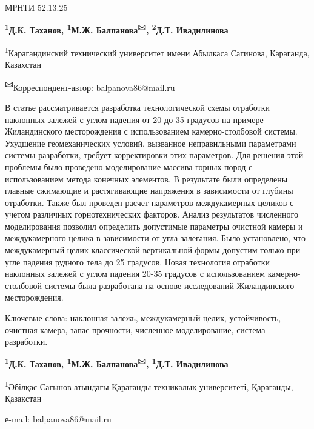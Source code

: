 \newpage
МРНТИ 52.13.25


\begin{center}
{\bfseries \textsuperscript{1}Д.К. Таханов, \textsuperscript{1}М.Ж.
Балпанова\textsuperscript{🖂}, \textsuperscript{2}Д.Т. Ивадилинова}

\textsuperscript{1}Карагандинский технический университет имени Абылкаса
Сагинова, Караганда, Казахстан

{\bfseries \textsuperscript{🖂}}Корреспондент-автор: balpanova86@mail.ru
\end{center}

В статье рассматривается разработка технологической схемы отработки
наклонных залежей с углом падения от 20 до 35 градусов на примере
Жиландинского месторождения с использованием камерно-столбовой системы.
Ухудшение геомеханических условий, вызванное неправильными параметрами
системы разработки, требует корректировки этих параметров. Для решения
этой проблемы было проведено моделирование массива горных пород с
использованием метода конечных элементов. В результате были определены
главные сжимающие и растягивающие напряжения в зависимости от глубины
отработки. Также был проведен расчет параметров междукамерных целиков с
учетом различных горнотехнических факторов. Анализ результатов
численного моделирования позволил определить допустимые параметры
очистной камеры и междукамерного целика в зависимости от угла залегания.
Было установлено, что междукамерный целик классической вертикальной
формы допустим только при угле падения рудного тела до 25 градусов.
Новая технология отработки наклонных залежей с углом падения 20-35
градусов с использованием камерно-столбовой системы была разработана на
основе исследований Жиландинского месторождения.

Ключевые слова: наклонная залежь, междукамерный целик, устойчивость,
очистная камера, запас прочности, численное моделирование, система
разработки.


\begin{center}
{\bfseries \textsuperscript{1}Д.К. Таханов, \textsuperscript{1}М.Ж.
Балпанова\textsuperscript{🖂}, \textsuperscript{1}Д.Т. Ивадилинова}

\textsuperscript{1}Әбілқас Сағынов атындағы Қарағанды техникалық
университеті, Қарағанды, Қазақстан

е-mail: balpanova86@mail.ru
\end{center}

